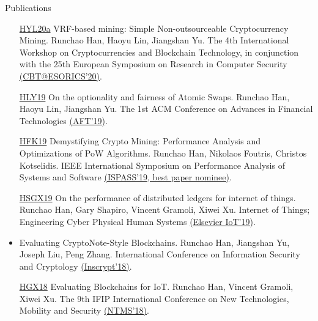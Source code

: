 \documentclass{resume} %
\begin{document}
\begin{rSection}{Publications}
\begin{itemize}
        \item[\href{https://github.com/DEX-ware/vrf-mining/blob/master/paper/main.pdf}{HYL20a}] VRF-based mining: Simple Non-outsourceable Cryptocurrency Mining. Runchao Han, Haoyu Lin, Jiangshan Yu. The 4th International Workshop on Cryptocurrencies and Blockchain Technology, in conjunction with the 25th European Symposium on Research in Computer Security \href{https://link.springer.com/chapter/10.1007/978-3-030-66172-4_19}{(CBT@ESORICS'20)}.
        \item[\href{https://eprint.iacr.org/2019/896}{HLY19}] On the optionality and fairness of Atomic Swaps. Runchao Han, Haoyu Lin, Jiangshan Yu. The 1st ACM Conference on Advances in Financial Technologies \href{https://dl.acm.org/doi/10.1145/3318041.3355460}{(AFT'19)}.
        \item[\href{https://www.research.manchester.ac.uk/portal/files/85753741/paper.pdf}{HFK19}] Demystifying Crypto Mining: Performance Analysis and Optimizations of PoW Algorithms. Runchao Han, Nikolaos Foutris, Christos Kotselidis. IEEE International Symposium on Performance Analysis of Systems and Software \href{https://ieeexplore.ieee.org/document/8695663}{(ISPASS'19, best paper nominee)}.
        \item[\href{https://gramoli.redbellyblockchain.io/web/doc/pubs/IoT2019.pdf}{HSGX19}] On the performance of distributed ledgers for internet of things. Runchao Han, Gary Shapiro, Vincent Gramoli, Xiwei Xu. Internet of Things; Engineering Cyber Physical Human Systems \href{https://www.sciencedirect.com/science/article/abs/pii/S2542660518300416}{(Elsevier IoT'19)}.
        \item[\href{https://www.researchgate.net/profile/Runchao_Han/publication/331227984_Evaluating_CryptoNote-Style_Blockchains_14th_International_Conference_Inscrypt_2018_Fuzhou_China_December_14-17_2018_Revised_Selected_Papers/links/5c747901299bf1268d25a5f5/Evaluating-CryptoNote-Style-Blockchains-14th-International-Conference-Inscrypt-2018-Fuzhou-China-December-14-17-2018-Revised-Selected-Papers.pdf}{HYLZ18}] Evaluating CryptoNote-Style Blockchains. Runchao Han, Jiangshan Yu, Joseph Liu, Peng Zhang. International Conference on Information Security and Cryptology \href{https://link.springer.com/chapter/10.1007/978-3-030-14234-6_2}{(Inscrypt'18)}.
        \item[\href{https://gramoli.redbellyblockchain.io/web/doc/pubs2/blockchain-iot.pdf}{HGX18}] Evaluating Blockchains for IoT. Runchao Han, Vincent Gramoli, Xiwei Xu. The 9th IFIP International Conference on New Technologies, Mobility and Security \href{https://ieeexplore.ieee.org/document/8328736}{(NTMS'18)}.
    \end{itemize}

\end{rSection}
\end{document}
